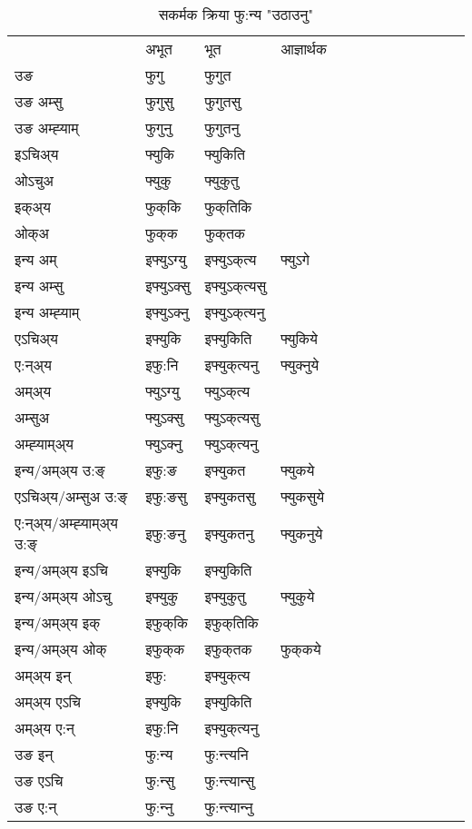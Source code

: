 \begin{table}[H]
\centering
\caption{\label{uk.vt} सकर्मक क्रिया  फु:न्य  "उठाउनु"  }
\begin{tabular}{l|l|l|l|l|l|l|l|l|l|l|l|l}  \toprule
&अभूत & भूत & आज्ञार्थक \\ 
उङ &फुगु &फुगुत \\ 
उङ अम्सु &फुगुसु &फुगुतसु \\ 
उङ अम्ह्‍याम् &फुगुनु &फुगुतनु \\ 
इऽचिअ्य &फ्युकि &फ्युकिति   \\ 
ओऽचुअ &फ्युकु &फ्युकुतु   \\ 
इक्अ्य &फुक्‌कि &फुक्‌तिकि   \\ 
ओक्अ &फुक्‌क &फुक्‌तक   \\ 
इन्य अम् & इफ्युऽग्यु  & इफ्युऽक्‌त्य &फ्युऽगे  \\ 
इन्य अम्सु & इफ्युऽक्सु  & इफ्युऽक्‌त्यसु   \\ 
इन्य अम्ह्‍याम् & इफ्युऽक्‍नु  & इफ्युऽक्‌त्यनु   \\ 
एऽचिअ्य & इफ्युकि & इफ्युकिति &फ्युकिये    \\ 
ए:न्अ्य & इफु:नि  & इफ्युक्‌त्यनु &फ्युक्‍नुये  \\ 
अम्अ्य & फ्युऽग्यु  & फ्युऽक्‌त्य  \\ 
अम्सुअ & फ्युऽक्सु & फ्युऽक्‌त्यसु  \\ 
अम्ह्‍याम्अ्य & फ्युऽक्‍नु  & फ्युऽक्‌त्यनु \\ 
\midrule
इन्य/अम्अ्य उ:ङ्‌&इफु:ङ & इफ्युकत &फ्युकये \\ 
एऽचिअ्य/अम्सुअ उ:ङ्‌ &इफु:ङसु & इफ्युकतसु &फ्युकसुये \\ 
ए:न्अ्य/अम्ह्‍याम्अ्य उ:ङ्‌ &इफु:ङनु & इफ्युकतनु &फ्युकनुये \\ 
इन्य/अम्अ्य इऽचि & इफ्युकि & इफ्युकिति    \\ 
इन्य/अम्अ्य ओऽचु & इफ्युकु & इफ्युकुतु  &फ्युकुये  \\ 
इन्य/अम्अ्य इक् & इफुक्‌कि & इफुक्‌तिकि   \\ 
इन्य/अम्अ्य ओक् & इफुक्‌क & इफुक्‌तक  &फुक्‌कये  \\ 
अम्अ्य इन् & इफु: & इफ्युक्‌त्य   \\ 
अम्अ्य एऽचि & इफ्युकि & इफ्युकिति    \\ 
अम्अ्य ए:न् & इफु:नि  & इफ्युक्‌त्यनु  \\ 
\midrule
उङ इन् & फु:न्य  & फु:न्त्यनि  \\ 
उङ एऽचि & फु:न्सु  & फु:न्त्यान्सु   \\ 
उङ ए:न्& फु:न्‍नु  & फु:न्त्यान्‍नु   \\ 
\bottomrule
\end{tabular}
\end{table}


